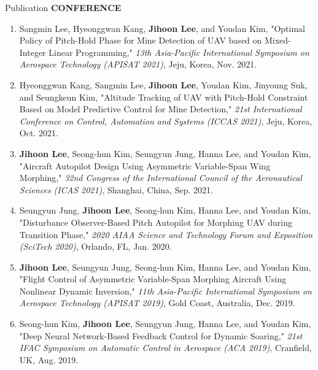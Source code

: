 \documentclass{resume}
\begin{document}
\begin{rSection}{Publication}
	\textbf{CONFERENCE}
	\begin{enumerate}\renewcommand{\labelenumi}{[C\theenumi]}
		
		\item Sangmin Lee, Hyeonggwan Kang, \textbf{Jihoon Lee}, and Youdan Kim, "Optimal Policy of Pitch-Hold Phase for Mine Detection of UAV based on Mixed-Integer Linear Programming," \textit{13th Asia-Pacific International Symposium on Aerospace Technology (APISAT 2021)}, Jeju, Korea, Nov. 2021. 
		
		\item Hyeonggwan Kang, Sangmin Lee, \textbf{Jihoon Lee}, Youdan Kim, Jinyoung Suk, and Seungkeun Kim, "Altitude Tracking of UAV with Pitch-Hold Constraint Based on Model Predictive Control for Mine Detection," \textit{21st International Conference on Control, Automation and Systems (ICCAS 2021)}, Jeju, Korea, Oct. 2021. 
		
		\item \textbf{Jihoon Lee}, Seong-hun Kim, Seungyun Jung, Hanna Lee, and Youdan Kim, "Aircraft Autopilot Design Using Asymmetric Variable-Span Wing Morphing," \textit{32nd Congress of the International Council of the Aeronautical Sciences (ICAS 2021)}, Shanghai, China, Sep. 2021. 
		
		\item Seungyun Jung, \textbf{Jihoon Lee}, Seong-hun Kim, Hanna Lee, and Youdan Kim, "Disturbance Observer-Based Pitch Autopilot for Morphing UAV during Transition Phase," \textit{2020 AIAA Science and Technology Forum and Exposition (SciTech 2020)}, Orlando, FL, Jan. 2020. \newline[DOI: 10.2514/6.2020-1087]
		
		\item \textbf{Jihoon Lee}, Seungyun Jung, Seong-hun Kim, Hanna Lee, and Youdan Kim, "Flight Control of Asymmetric Variable-Span Morphing Aircraft Using Nonlinear Dynamic Inversion," \textit{11th Asia-Pacific International Symposium on Aerospace Technology (APISAT 2019)}, Gold Coast, Australia, Dec. 2019. 
	
		\item Seong-hun Kim, \textbf{Jihoon Lee}, Seungyun Jung, Hanna Lee, and Youdan Kim, "Deep Neural Network-Based Feedback Control for Dynamic Soaring," \textit{21st IFAC Symposium on Automatic Control in Aerospace (ACA 2019)}, Cranfield, UK, Aug. 2019. 
		

\end{enumerate}
\end{rSection}
\end{document}
